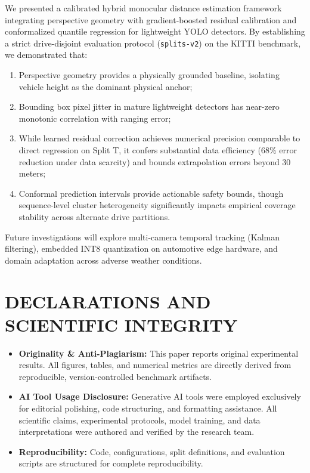 \documentclass[]{spie}  %
\begin{document}
We presented a calibrated hybrid monocular distance estimation framework integrating perspective geometry with gradient-boosted residual calibration and conformalized quantile regression for lightweight YOLO detectors. By establishing a strict drive-disjoint evaluation protocol (\texttt{splits-v2}) on the KITTI benchmark, we demonstrated that:
\begin{enumerate}
    \item Perspective geometry provides a physically grounded baseline, isolating vehicle height as the dominant physical anchor;
    \item Bounding box pixel jitter in mature lightweight detectors has near-zero monotonic correlation with ranging error;
    \item While learned residual correction achieves numerical precision comparable to direct regression on Split T, it confers substantial data efficiency ($68\%$ error reduction under data scarcity) and bounds extrapolation errors beyond 30 meters;
    \item Conformal prediction intervals provide actionable safety bounds, though sequence-level cluster heterogeneity significantly impacts empirical coverage stability across alternate drive partitions.
\end{enumerate}

Future investigations will explore multi-camera temporal tracking (Kalman filtering), embedded INT8 quantization on automotive edge hardware, and domain adaptation across adverse weather conditions.

\section*{DECLARATIONS AND SCIENTIFIC INTEGRITY}
\begin{itemize}
    \item \textbf{Originality \& Anti-Plagiarism:} This paper reports original experimental results. All figures, tables, and numerical metrics are directly derived from reproducible, version-controlled benchmark artifacts.
    \item \textbf{AI Tool Usage Disclosure:} Generative AI tools were employed exclusively for editorial polishing, code structuring, and formatting assistance. All scientific claims, experimental protocols, model training, and data interpretations were authored and verified by the research team.
    \item \textbf{Reproducibility:} Code, configurations, split definitions, and evaluation scripts are structured for complete reproducibility.
\end{itemize}



\end{document}
